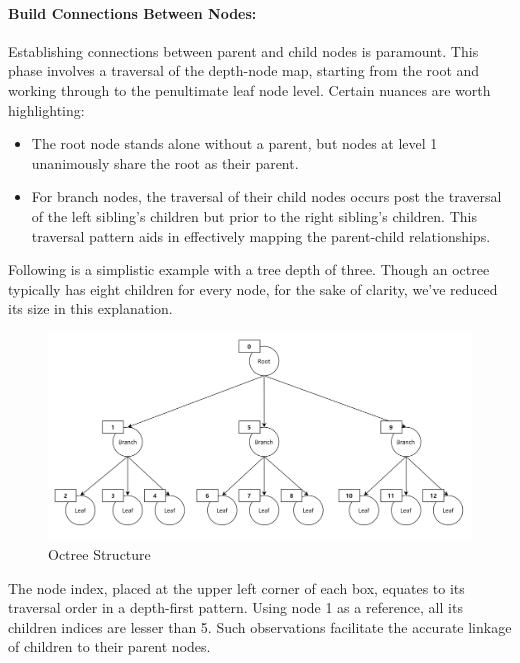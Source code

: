 \documentclass[11pt, a4paper,oneside,chapterprefix=false]{scrbook}
\begin{document}
\paragraph{Build Connections Between Nodes:} Establishing connections between parent and child nodes is paramount. This phase involves a traversal of the depth-node map, starting from the root and working through to the penultimate leaf node level. Certain nuances are worth highlighting:

\begin{itemize}
	\item The root node stands alone without a parent, but nodes at level 1 unanimously share the root as their parent.
	\item For branch nodes, the traversal of their child nodes occurs post the traversal of the left sibling's children but prior to the right sibling's children. This traversal pattern aids in effectively mapping the parent-child relationships.
\end{itemize}

Following is a simplistic example with a tree depth of three. Though an octree typically has eight children for every node, for the sake of clarity, we've reduced its size in this explanation. 

\noindent
\begin{minipage}{\textwidth}
	\begin{figure}[H]
		\centering
		\includegraphics*[width=1.0\textwidth]{figures/octree.png}
		\caption{Octree Structure}
		\label{fig:octree structure}
	\end{figure}
\end{minipage}

The node index, placed at the upper left corner of each box, equates to its traversal order in a depth-first pattern. Using node 1 as a reference, all its children indices are lesser than 5. Such observations facilitate the accurate linkage of children to their parent nodes.
\end{document}
